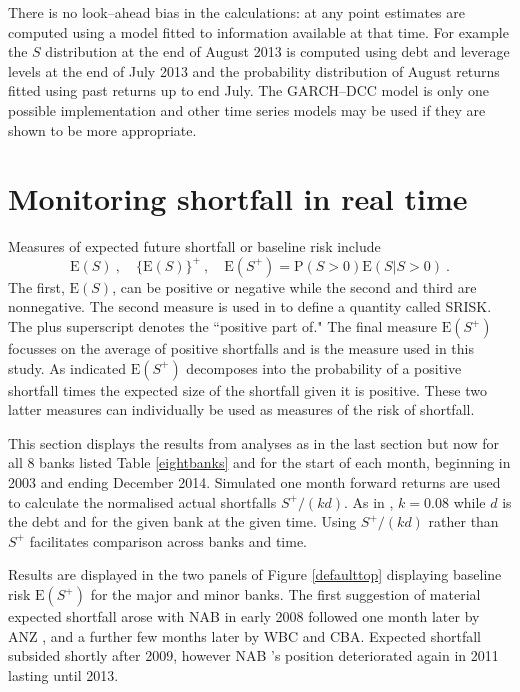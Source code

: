 \documentclass[authoryear]{elsarticle}
\newcommand{\E}{{\mathrm E}}
\newcommand{\p}{\mathrm{P}}
\newcommand{\cq}{\ ,\quad }
\newcommand{\fref}[1]{Figure \ref{#1}}
\newcommand{\tref}[1]{Table \ref{#1}}
\begin{document}
There is no look--ahead bias in the calculations:  at any point estimates are computed using a model fitted to information available at that time.  For example the $S$ distribution at the  end of August 2013 is computed using debt and leverage levels at the end of July 2013 and the probability distribution of August returns fitted using past returns up to end July.  The GARCH--DCC model is only one possible implementation and other time series models may be used if they are shown to be more appropriate.




\section{Monitoring shortfall in real time}\label{brisk}

Measures of expected future shortfall or baseline risk include
$$
\E(S) \cq \{\E(S)\}^+ \cq \E(S^+)= \p(S>0)\E(S|S>0)\ . 
$$
The first, $\E(S)$, can be positive or negative while the second and third are nonnegative.   The second measure is used in \cite{brownlees2015} to define a quantity called  SRISK.  The plus superscript denotes the ``positive part of."  The final measure $\E(S^+)$ focusses on the average of positive shortfalls and is the measure used in this study.   As indicated $\E(S^+)$ decomposes into the probability of a positive shortfall times the expected size of the shortfall given it is positive.   These two latter measures can individually be used as measures of the risk of shortfall.

This section displays the results from analyses as in the last section but now for all 8 banks listed \tref{eightbanks} and for the start of  each month,  beginning in 2003 and ending December 2014.   Simulated one month forward returns are used to calculate the normalised actual shortfalls
$
S^+/(kd)
$.
 As in \cite{brownlees2015}, $k=0.08$ while $d$ is the debt and for the given bank at the given time.  Using $S^+/(kd)$ rather than $S^+$  facilitates comparison across banks and  time.

Results are displayed in the two  panels of \fref{defaulttop} displaying baseline risk $\E(S^+)$ for the major and minor banks. The first suggestion of material expected shortfall arose with NAB  in early 2008 followed one month later by ANZ , and a further few months later by WBC  and CBA. Expected shortfall subsided shortly after 2009, however NAB 's position deteriorated again in 2011 lasting until 2013. 
\end{document}

